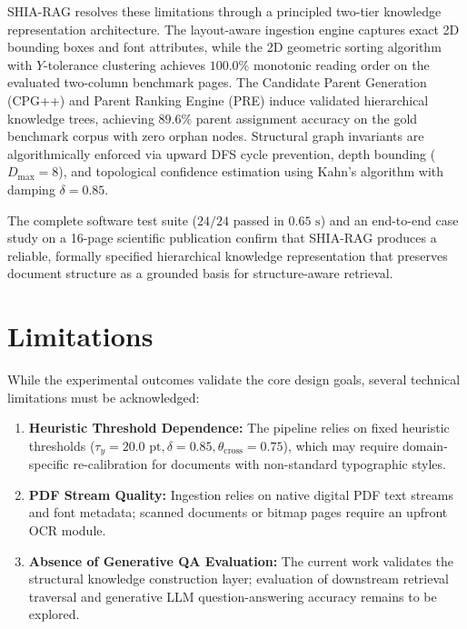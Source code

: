 \documentclass[12pt,a4paper]{report}
\begin{document}
SHIA-RAG resolves these limitations through a principled two-tier knowledge representation architecture. The layout-aware ingestion engine captures exact 2D bounding boxes and font attributes, while the 2D geometric sorting algorithm with $Y$-tolerance clustering achieves $100.0\%$ monotonic reading order on the evaluated two-column benchmark pages. The Candidate Parent Generation (CPG++) and Parent Ranking Engine (PRE) induce validated hierarchical knowledge trees, achieving $89.6\%$ parent assignment accuracy on the gold benchmark corpus with zero orphan nodes. Structural graph invariants are algorithmically enforced via upward DFS cycle prevention, depth bounding ($D_{\max} = 8$), and topological confidence estimation using Kahn's algorithm with damping $\delta = 0.85$.

The complete software test suite ($24/24$ passed in $0.65\text{ s}$) and an end-to-end case study on a 16-page scientific publication confirm that SHIA-RAG produces a reliable, formally specified hierarchical knowledge representation that preserves document structure as a grounded basis for structure-aware retrieval.

\section{Limitations}
While the experimental outcomes validate the core design goals, several technical limitations must be acknowledged:
\begin{enumerate}
    \item \textbf{Heuristic Threshold Dependence:} The pipeline relies on fixed heuristic thresholds ($\tau_y = 20.0\text{ pt}, \delta = 0.85, \theta_{\text{cross}} = 0.75$), which may require domain-specific re-calibration for documents with non-standard typographic styles.
    \item \textbf{PDF Stream Quality:} Ingestion relies on native digital PDF text streams and font metadata; scanned documents or bitmap pages require an upfront OCR module.
    \item \textbf{Absence of Generative QA Evaluation:} The current work validates the structural knowledge construction layer; evaluation of downstream retrieval traversal and generative LLM question-answering accuracy remains to be explored.
\end{enumerate}
\end{document}
